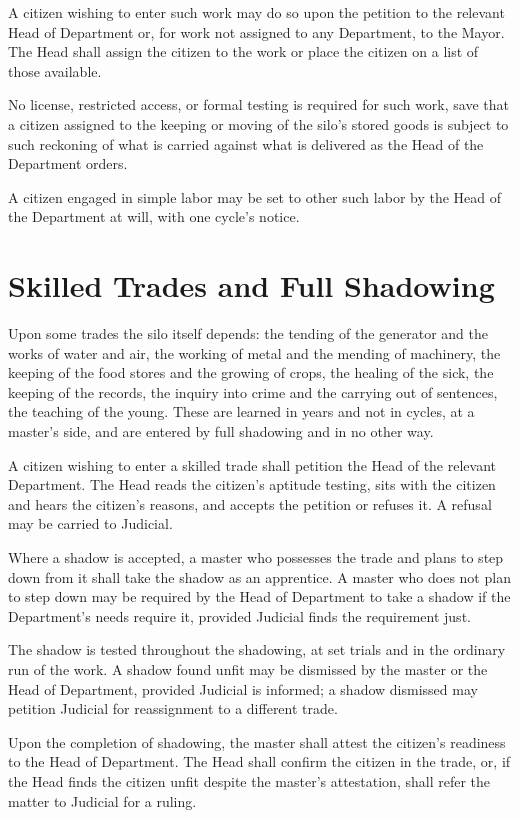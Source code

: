 \begin{clauses}
\item A citizen wishing to enter such work may do so upon the petition to the relevant Head of Department or, for work not assigned to any Department, to the Mayor. The Head shall assign the citizen to the work or place the citizen on a list of those available.
\item No license, restricted access, or formal testing is required for such work, save that a citizen assigned to the keeping or moving of the silo's stored goods is subject to such reckoning of what is carried against what is delivered as the Head of the Department orders.
\item A citizen engaged in simple labor may be set to other such labor by the Head of the Department at will, with one cycle's notice.
\end{clauses}

\section{Skilled Trades and Full Shadowing}
\label{sec:labor:skilled-trades-and-full-shadowing}

Upon some trades the silo itself depends: the tending of the generator and the works of water and air, the working of metal and the mending of machinery, the keeping of the food stores and the growing of crops, the healing of the sick, the keeping of the records, the inquiry into crime and the carrying out of sentences, the teaching of the young. These are learned in years and not in cycles, at a master's side, and are entered by full shadowing and in no other way.

\begin{clauses}
\item A citizen wishing to enter a skilled trade shall petition the Head of the relevant Department. The Head reads the citizen's aptitude testing, sits with the citizen and hears the citizen's reasons, and accepts the petition or refuses it. A refusal may be carried to Judicial.
\item Where a shadow is accepted, a master who possesses the trade and plans to step down from it shall take the shadow as an apprentice. A master who does not plan to step down may be required by the Head of Department to take a shadow if the Department's needs require it, provided Judicial finds the requirement just.
\item The shadow is tested throughout the shadowing, at set trials and in the ordinary run of the work. A shadow found unfit may be dismissed by the master or the Head of Department, provided Judicial is informed; a shadow dismissed may petition Judicial for reassignment to a different trade.
\item Upon the completion of shadowing, the master shall attest the citizen's readiness to the Head of Department. The Head shall confirm the citizen in the trade, or, if the Head finds the citizen unfit despite the master's attestation, shall refer the matter to Judicial for a ruling.
\end{clauses}

